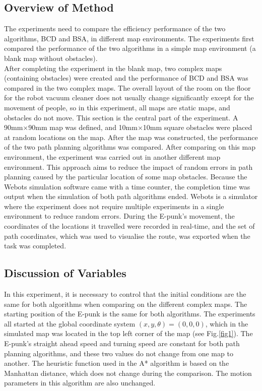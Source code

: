 \documentclass[conference]{IEEEtran}
\begin{document}
\subsection{Overview of Method}
The experiments need to compare the efficiency performance of the two algorithms, BCD and BSA, in different map environments. The experiments first compared the performance of the two algorithms in a simple map environment (a blank map without obstacles).\\
After completing the experiment in the blank map, two complex maps (containing obstacles) were created and the performance of BCD and BSA was compared in the two complex maps. The overall layout of the room on the floor for the robot vacuum cleaner does not usually change significantly except for the movement of people, so in this experiment, all maps are static maps, and obstacles do not move. This section is the central part of the experiment. A 90mm$\times$90mm map was defined, and 10mm$\times$10mm square obstacles were placed at random locations on the map. After the map was constructed, the performance of the two path planning algorithms was compared. After comparing on this map environment, the experiment was carried out in another different map environment. This approach aims to reduce the impact of random errors in path planning caused by the particular location of some map obstacles. Because the Webots simulation software came with a time counter, the completion time was output when the simulation of both path algorithms ended. Webots is a simulator where the experiment does not require multiple experiments in a single environment to reduce random errors. During the E-punk's movement, the coordinates of the locations it travelled were recorded in real-time, and the set of path coordinates, which was used to visualise the route, was exported when the task was completed.
\subsection{Discussion of Variables}
In this experiment, it is necessary to control that the initial conditions are the same for both algorithms when comparing on the different complex maps. The starting position of the E-punk is the same for both algorithms. The experiments all started at the global coordinate system $(x, y, \theta) = (0, 0, 0)$, which in the simulated map was located in the top left corner of the map (see Fig.\ref{fig1}). The E-punk's straight ahead speed and turning speed are constant for both path planning algorithms, and these two values do not change from one map to another. The heuristic function used in the A* algorithm is based on the Manhattan distance, which does not change during the comparison. The motion parameters in this algorithm are also unchanged.
\end{document}

